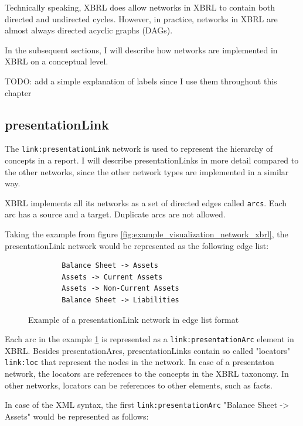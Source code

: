 Technically speaking, XBRL does allow networks in XBRL to contain both directed and undirected cycles.
However, in practice, networks in XBRL are almost always directed acyclic graphs (DAGs).

In the subsequent sections, I will describe how networks are implemented in XBRL on a conceptual level. 

TODO: add a simple explanation of labels since I use them throughout this chapter

\subsection{presentationLink}

The \texttt{link:presentationLink} network is used to represent the hierarchy of concepts in a report.
I will describe presentationLinks in more detail compared to the other networks, since the other network types are implemented in a similar way.

XBRL implements all its networks as a set of directed edges called \texttt{arcs}.
Each arc has a source and a target. Duplicate arcs are not allowed.

Taking the example from figure \ref{fig:example_visualization_network_xbrl}, the presentationLink network would be represented as the following edge list:

\begin{figure}[H]
    \caption{Example of a presentationLink network in edge list format}
    \label{fig:example_visualization_network_xbrl_edge_list}
    \begin{verbatim}
        Balance Sheet -> Assets
        Assets -> Current Assets
        Assets -> Non-Current Assets
        Balance Sheet -> Liabilities
    \end{verbatim}
\end{figure}

Each arc in the example \ref{fig:example_visualization_network_xbrl_edge_list} is represented as a \texttt{link:presentationArc} element in XBRL.
Besides presentationArcs, presentationLinks contain so called "locators" \texttt{link:loc} that represent the nodes in the network.
In case of a presentaton network, the locators are references to the concepts in the XBRL taxonomy. 
In other networks, locators can be references to other elements, such as facts.

In case of the XML syntax, the first \texttt{link:presentationArc} "Balance Sheet -> Assets" would be represented as follows:

